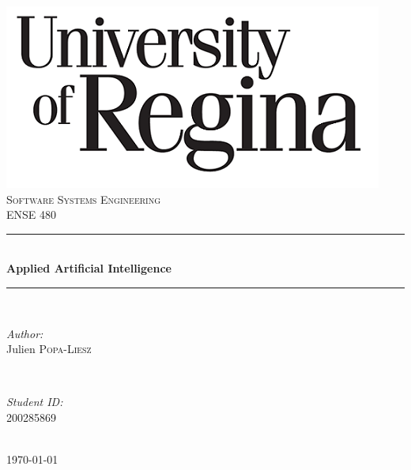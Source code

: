 \documentclass[12pt]{article} %
\begin{document}

\begin{titlepage}
\newcommand{\HRule}{\rule{\linewidth}{0.5mm}} %

\center %

\includegraphics{logoblack}\\[1cm] %

\textsc{\Large Software Systems Engineering}\\[0.5cm] %
\textsc{\large ENSE 480}\\[0.5cm] %

\HRule \\[0.4cm]
{ \huge \bfseries Applied Artificial Intelligence}\\[0.4cm] %
\HRule \\[1.5cm]

\begin{minipage}{0.4\textwidth}
\begin{flushleft} \large
\emph{Author:}\\
Julien \textsc{Popa-Liesz} %
\end{flushleft}
\end{minipage}
~
\begin{minipage}{0.4\textwidth}
\begin{flushright} \large
\emph{Student ID:} \\
200285869 %
\end{flushright}
\end{minipage}\\[4cm]

{\large \today}\\[3cm] %



\vfill %

\end{titlepage}
\end{document}
